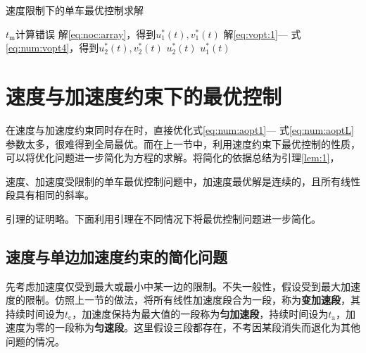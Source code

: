 \begin{algorithm}
\small
\caption{速度限制下的单车最优控制求解}
\label{alg:vsin}
\begin{algorithmic}
  \Statex
      \State $t_\mathrm{m}$计算错误
      \State \Return
    \EndIf
    \State 解\eqref{eq:noc:array}，得到$u_1^*(t),v^*_1(t)$
      \State 解\eqref{eq:vopt:1}--- 式\eqref{eq:num:vopt4}，得到$u_2^*(t),v^*_2(t)$
      \State \Return $u_2^*(t)$
    \Else
      \State \Return $u_1^*(t)$
    \EndIf
  \EndFunction
\end{algorithmic}
\end{algorithm}

\section{速度与加速度约束下的最优控制}
在速度与加速度约束同时存在时，直接优化式\eqref{eq:num:aopt1}--- 式\eqref{eq:num:aoptL}参数太多，很难得到全局最优。而在上一节中，利用速度约束下最优控制的性质，可以将优化问题进一步简化为方程的求解。将简化的依据总结为引理\ref{lem:1}，
\begin{lemma}
速度、加速度受限制的单车最优控制问题中，加速度最优解是连续的，且所有线性段具有相同的斜率。
\label{lem:1}
\end{lemma}

引理的证明略。下面利用引理在不同情况下将最优控制问题进一步简化。

\subsection{速度与单边加速度约束的简化问题}
先考虑加速度仅受到最大或最小中某一边的限制。不失一般性，假设受到最大加速度的限制。仿照上一节的做法，将所有线性加速度段合为一段，称为\textbf{变加速段}，其持续时间设为$t_\mathrm{c}$，加速度保持为最大值的一段称为\textbf{匀加速段}，持续时间设为$t_\mathrm{a}$，加速度为零的一段称为\textbf{匀速段}。这里假设三段都存在，不考因某段消失而退化为其他问题的情况。

